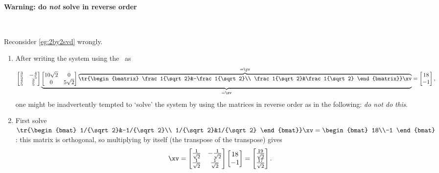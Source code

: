 \paragraph{Warning: do \emph{not} solve in reverse order} \ 
\begin{example} 
Reconsider \cref{eg:2by2svd} wrongly.
\begin{enumerate}
\item 
After writing the system using the \svd\ as
\begin{equation*}
\begin{bmatrix} \frac35&-\frac45\\\frac45&\frac35 \end{bmatrix}
\underbrace{\begin{bmatrix} 10\sqrt2&0\\0&5\sqrt2 \end{bmatrix}
\overbrace{\tr{\begin{bmatrix} \frac1{\sqrt2}&-\frac1{\sqrt2}\\ \frac1{\sqrt2}&\frac1{\sqrt2} \end{bmatrix}}\xv}^{=\yv}}_{=\zv}=\begin{bmatrix} 18\\-1 \end{bmatrix},
\end{equation*}
one might be inadvertently tempted to `solve' the system by using the matrices in reverse order as in the following: \emph{do not do this}.

\item First solve \(\tr{\begin{bmat} 1/{\sqrt2}&-1/{\sqrt2}\\ 1/{\sqrt2}&1/{\sqrt2} \end{bmat}}\xv=\begin{bmat} 18\\-1 \end{bmat}\):  this matrix is orthogonal, so multiplying by itself (the transpose of the transpose) gives 
\begin{equation*}
\xv=\begin{bmatrix} \frac1{\sqrt2}&-\frac1{\sqrt2}\\ \frac1{\sqrt2}&\frac1{\sqrt2} \end{bmatrix}
\begin{bmatrix} 18\\-1 \end{bmatrix}
=\begin{bmatrix} \frac{19}{\sqrt2}\\\frac{17}{\sqrt2} \end{bmatrix}.
\end{equation*}


\end{enumerate}
\end{example}
